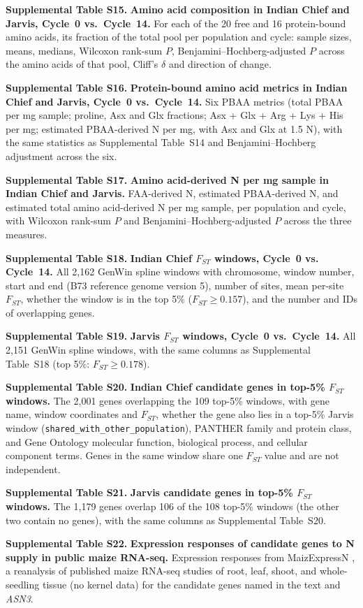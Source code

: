 \documentclass[11pt]{article}
\begin{document}
\noindent\textbf{Supplemental Table S15.} \textbf{Amino acid composition in Indian Chief and Jarvis, Cycle~0 vs.\ Cycle~14.} For each of the 20 free and 16 protein-bound amino acids, its fraction of the total pool per population and cycle: sample sizes, means, medians, Wilcoxon rank-sum $P$, Benjamini--Hochberg-adjusted $P$ across the amino acids of that pool, Cliff's $\delta$ and direction of change.

\noindent\textbf{Supplemental Table S16.} \textbf{Protein-bound amino acid metrics in Indian Chief and Jarvis, Cycle~0 vs.\ Cycle~14.} Six PBAA metrics (total PBAA per mg sample; proline, Asx and Glx fractions; Asx + Glx + Arg + Lys + His per mg; estimated PBAA-derived N per mg, with Asx and Glx at 1.5 N), with the same statistics as Supplemental Table~S14 and Benjamini--Hochberg adjustment across the six.

\noindent\textbf{Supplemental Table S17.} \textbf{Amino acid-derived N per mg sample in Indian Chief and Jarvis.} FAA-derived N, estimated PBAA-derived N, and estimated total amino acid-derived N per mg sample, per population and cycle, with Wilcoxon rank-sum $P$ and Benjamini--Hochberg-adjusted $P$ across the three measures.

\noindent\textbf{Supplemental Table S18.} \textbf{Indian Chief $F_{ST}$ windows, Cycle~0 vs. Cycle~14.} All 2,162 GenWin spline windows with chromosome, window number, start and end (B73 reference genome version 5), number of sites, mean per-site $F_{ST}$, whether the window is in the top 5\% ($F_{ST} \geq 0.157$), and the number and IDs of overlapping genes.

\noindent\textbf{Supplemental Table S19.} \textbf{Jarvis $F_{ST}$ windows, Cycle~0 vs.\ Cycle~14.} All 2,151 GenWin spline windows, with the same columns as Supplemental Table~S18 (top 5\%: $F_{ST} \geq 0.178$).

\noindent\textbf{Supplemental Table S20.} \textbf{Indian Chief candidate genes in top-5\% $F_{ST}$ windows.} The 2,001 genes overlapping the 109 top-5\% windows, with gene name, window coordinates and $F_{ST}$, whether the gene also lies in a top-5\% Jarvis window (\texttt{shared\_with\_other\_population}), PANTHER family and protein class, and Gene Ontology molecular function, biological process, and cellular component terms. Genes in the same window share one $F_{ST}$ value and are not independent.

\noindent\textbf{Supplemental Table S21.} \textbf{Jarvis candidate genes in top-5\% $F_{ST}$ windows.} The 1,179 genes overlap 106 of the 108 top-5\% windows (the other two contain no genes), with the same columns as Supplemental Table~S20.

\noindent\textbf{Supplemental Table S22.} \textbf{Expression responses of candidate genes to N supply in public maize RNA-seq.} Expression responses from MaizExpressN \citep{MaizExpressN}, a reanalysis of published maize RNA-seq studies of root, leaf, shoot, and whole-seedling tissue (no kernel data) for the candidate genes named in the text and \textit{ASN3}.




\end{document}
